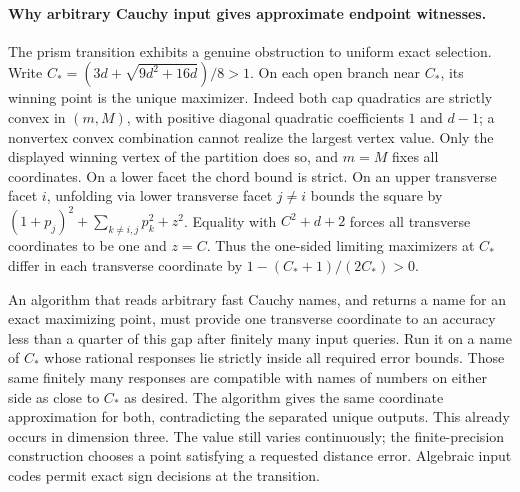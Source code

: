 \documentclass[10pt,letterpaper]{article}
\begin{document}
\paragraph{Why arbitrary Cauchy input gives approximate endpoint witnesses.}
The prism transition exhibits a genuine obstruction to uniform exact
selection. Write $C_*=(3d+\sqrt{9d^2+16d})/8>1$. On each open
branch near $C_*$, its winning point is the unique maximizer.
Indeed both cap quadratics are strictly convex in $(m,M)$, with
positive diagonal quadratic coefficients $1$ and $d-1$; a
nonvertex convex combination cannot realize the largest vertex
value. Only the displayed winning vertex of the partition does so,
and $m=M$ fixes all coordinates. On a lower facet the chord bound
is strict. On an upper transverse facet $i$, unfolding via lower
transverse facet $j\ne i$ bounds the square by
$(1+p_j)^2+\sum_{k\ne i,j}p_k^2+z^2$. Equality with
$C^2+d+2$ forces all transverse coordinates to be one and $z=C$.
Thus the one-sided limiting maximizers at $C_*$ differ in each
transverse coordinate by $1-(C_*+1)/(2C_*)>0$.

An algorithm that reads arbitrary fast Cauchy names, and returns a
name for an exact maximizing point, must provide one transverse
coordinate to an accuracy less than a quarter of this gap after
finitely many input queries. Run it on a name of $C_*$ whose
rational responses lie strictly inside all required error bounds.
Those same finitely many responses are compatible with names of
numbers on either side as close to $C_*$ as desired. The algorithm
gives the same coordinate approximation for both, contradicting
the separated unique outputs. This already occurs in dimension
three. The value still varies continuously; the finite-precision
construction chooses a point satisfying a requested distance error.
Algebraic input codes permit exact sign decisions at the transition.
\end{document}
